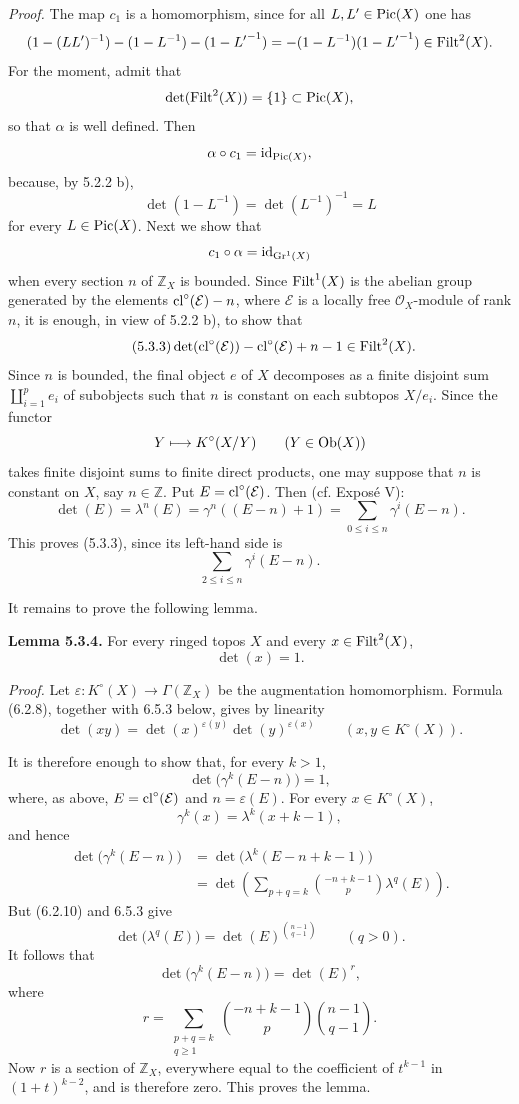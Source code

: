 \emph{Proof.}
The map $c_1$ is a homomorphism, since for all $L,L'\in\operatorname{Pic}(X)$ one has
\[
(1-(LL')^{-1})-(1-L^{-1})-(1-{L'}^{-1})
=-(1-L^{-1})(1-{L'}^{-1})\in\operatorname{Filt}^2(X).
\]
For the moment, admit that
\[
\det(\operatorname{Filt}^2(X))=\{1\}\subset\operatorname{Pic}(X),
\]
so that $\alpha$ is well defined. Then
\[
\alpha\circ c_1=\operatorname{id}_{\operatorname{Pic}(X)},
\]
because, by 5.2.2 b),
\[
\det(1-L^{-1})=\det(L^{-1})^{-1}=L
\]
for every $L\in\operatorname{Pic}(X)$. Next we show that
\[
c_1\circ\alpha=\operatorname{id}_{\operatorname{Gr}^1(X)}
\]
when every section $n$ of $\mathbb Z_X$ is bounded. Since $\operatorname{Filt}^1(X)$ is
the abelian group generated by the elements $\operatorname{cl}^\circ(\mathcal E)-n$, where
$\mathcal E$ is a locally free $\mathcal O_X$-module of rank $n$, it is
enough, in view of 5.2.2 b), to show that
\begin{equation}\tag{5.3.3}
\det(\operatorname{cl}^\circ(\mathcal E))-\operatorname{cl}^\circ(\mathcal E)+n-1\in\operatorname{Filt}^2(X).
\end{equation}
Since $n$ is bounded, the final object $e$ of $X$ decomposes as a finite
disjoint sum $\coprod_{i=1}^p e_i$ of subobjects such that $n$ is constant on
each subtopos $X/e_i$. Since the functor
\[
Y\longmapsto K^\circ(X/Y)\qquad(Y\in\operatorname{Ob}(X))
\]
takes finite disjoint sums to finite direct products, one may suppose that
$n$ is constant on $X$, say $n\in\mathbb Z$. Put
$E=\operatorname{cl}^\circ(\mathcal E)$. Then (cf. Expos\'e V):
\[
\det(E)=\lambda^n(E)=\gamma^n((E-n)+1)
=\sum_{0\leq i\leq n}\gamma^i(E-n).
\]
This proves (5.3.3), since its left-hand side is
\[
\sum_{2\leq i\leq n}\gamma^i(E-n).
\]

It remains to prove the following lemma.

\textbf{Lemma 5.3.4.}
For every ringed topos $X$ and every $x\in\operatorname{Filt}^2(X)$,
\[
\det(x)=1.
\]

\emph{Proof.}
Let $\varepsilon:K^\circ(X)\to\Gamma(\mathbb Z_X)$ be the augmentation
homomorphism. Formula (6.2.8), together with 6.5.3 below, gives by linearity
\begin{equation}\tag{5.3.5}
\det(xy)=\det(x)^{\varepsilon(y)}\det(y)^{\varepsilon(x)}
\qquad(x,y\in K^\circ(X)).
\end{equation}

It is therefore enough to show that, for every $k>1$,
\[
\det\bigl(\gamma^k(E-n)\bigr)=1,
\]
where, as above, $E=\operatorname{cl}^\circ(\mathcal E)$ and
$n=\varepsilon(E)$. For every $x\in K^\circ(X)$,
\[
\gamma^k(x)=\lambda^k(x+k-1),
\]
and hence
\[
\begin{aligned}
\det\bigl(\gamma^k(E-n)\bigr)
&=\det\bigl(\lambda^k(E-n+k-1)\bigr)\\
&=\det\left(
\sum_{p+q=k}\binom{-n+k-1}{p}\lambda^q(E)
\right).
\end{aligned}
\]
But (6.2.10) and 6.5.3 give
\[
\det\bigl(\lambda^q(E)\bigr)
=\det(E)^{\binom{n-1}{q-1}}
\qquad(q>0).
\]
It follows that
\[
\det\bigl(\gamma^k(E-n)\bigr)=\det(E)^r,
\]
where
\[
r=\sum_{\substack{p+q=k\\q\geq1}}
\binom{-n+k-1}{p}\binom{n-1}{q-1}.
\]
Now $r$ is a section of $\mathbb Z_X$, everywhere equal to the coefficient of
$t^{k-1}$ in $(1+t)^{k-2}$, and is therefore zero. This proves the lemma.

